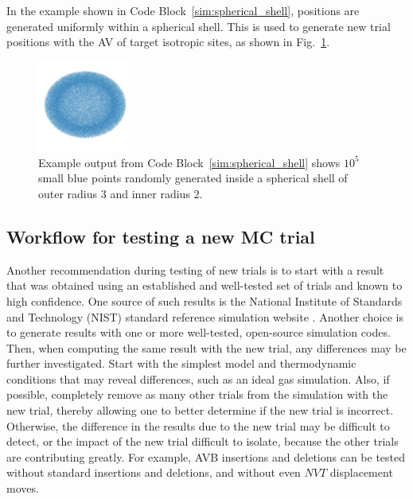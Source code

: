 \documentclass[
  9pt,
  bestpractices,
]{livecoms}
\begin{document}
In the example shown in Code Block~\ref{sim:spherical_shell}, positions are generated uniformly within a spherical shell.
This is used to generate new trial positions with the AV of target isotropic sites, as shown in Fig.~\ref{fig:spherical_shell}.

\begin{figure}

\end{figure}

\begin{figure}
\begin{centering}
\includegraphics[width=3cm]{../codes/spherical_shell.png}
\caption{
Example output from Code Block~\ref{sim:spherical_shell} shows $10^5$ small blue points randomly generated inside a spherical shell of outer radius $3$ and inner radius $2$.
\label{fig:spherical_shell}
}
\end{centering}
\end{figure}

\subsection{\label{sec:testingnewtrial}Workflow for testing a new MC trial}

Another recommendation during testing of new trials is to start with a result that was obtained using an established and well-tested set of trials and known to high confidence.
One source of such results is the National Institute of Standards and Technology (NIST) standard reference simulation website \cite{shen_nist_2017}.
Another choice is to generate results with one or more well-tested, open-source simulation codes.
Then, when computing the same result with the new trial, any differences may be further investigated.
Start with the simplest model and thermodynamic conditions that may reveal differences, such as an ideal gas simulation.
Also, if possible, completely remove as many other trials from the simulation with the new trial, thereby allowing one to better determine if the new trial is incorrect.
Otherwise, the difference in the results due to the new trial may be difficult to detect, or the impact of the new trial difficult to isolate, because the other trials are contributing greatly.
For example, AVB insertions and deletions can be tested without standard insertions and deletions, and without even $NVT$ displacement moves.
\end{document}

